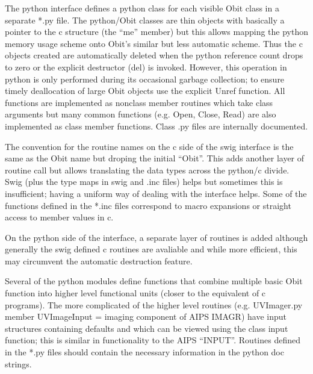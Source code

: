 \documentclass[11pt]{article}
\begin{document}
The python interface defines a python class for each visible Obit
class in a separate *.py file.
The python/Obit classes are thin objects with basically a pointer to
the c structure (the ``me'' member) but this allows mapping the python
memory usage scheme onto Obit's similar but less automatic scheme. 
Thus the c objects created are automatically deleted when the python
reference count drops to zero or the explicit destructor (del) is
invoked.
However, this operation in python is only performed during its
occasional garbage collection; to ensure timely deallocation of large
Obit objects use the explicit Unref function.
All functions are implemented as nonclass member routines which take
class arguments but many common functions (e.g. Open, Close, Read) are
also implemented as class member functions.
Class .py files are internally documented.

The convention for the routine names on the c side of the swig
interface is the same as the Obit name but droping the initial
``Obit''.
This adds another layer of routine call but allows translating the
data types across the python/c divide.
Swig (plus the type maps in swig and .inc files) helps but sometimes 
this is insufficient; having a uniform way of dealing with the
interface helps.
Some of the functions defined in the *.inc files correspond to macro
expansions or straight access to member values in c.

   On the python side of the interface, a separate layer of routines
is added although generally the swig defined c routines are avaliable
and while more efficient, this may circumvent the automatic
destruction feature.

   Several of the python modules define functions that combine
multiple basic Obit function into higher level functional units
(closer to the equivalent of c programs).
The more complicated of the higher level routines (e.g. UVImager.py
member UVImageInput = imaging component of AIPS IMAGR) have input 
structures containing defaults and which can be viewed using the class
input function; this is similar in functionality to the AIPS
``INPUT''.
Routines defined in the *.py files should contain the necessary
information in the python doc strings.
\end{document}
